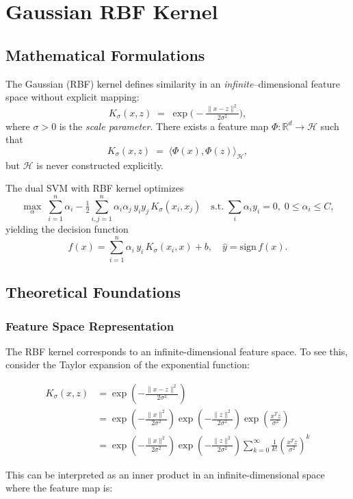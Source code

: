 \documentclass[11pt]{article}
\begin{document}
\section{Gaussian RBF Kernel}

\subsection{Mathematical Formulations}
The Gaussian (RBF) kernel defines similarity in an \emph{infinite}–dimensional feature space without explicit mapping:
\[
K_\sigma(x,z) \;=\;\exp\!\bigl(-\tfrac{\|x-z\|^2}{2\sigma^2}\bigr),
\]
where $\sigma>0$ is the \emph{scale parameter}. There exists a feature map $\Phi: \mathbb{R}^d\to\mathcal{H}$ such that
\[
K_\sigma(x,z) \;=\;\langle \Phi(x),\Phi(z)\rangle_{\mathcal{H}},
\]
but $\mathcal{H}$ is never constructed explicitly.

The dual SVM with RBF kernel optimizes
\[
\max_{\alpha}\;\sum_{i=1}^n \alpha_i
-\tfrac{1}{2}\sum_{i,j=1}^n\alpha_i\alpha_j\,y_i y_j\,K_\sigma(x_i,x_j)
\quad\text{s.t.}\;\sum_i \alpha_i y_i=0,\;0\le \alpha_i\le C,
\]
yielding the decision function
\[
f(x)=\sum_{i=1}^n \alpha_i\,y_i\,K_\sigma(x_i,x) + b,\quad
\hat y=\mathrm{sign}\,f(x).
\]

\subsection{Theoretical Foundations}

\subsubsection{Feature Space Representation}
The RBF kernel corresponds to an infinite-dimensional feature space. To see this, consider the Taylor expansion of the exponential function:

\begin{align}
K_\sigma(x,z) &= \exp\left(-\frac{\|x-z\|^2}{2\sigma^2}\right) \\
&= \exp\left(-\frac{\|x\|^2}{2\sigma^2}\right) \exp\left(-\frac{\|z\|^2}{2\sigma^2}\right) \exp\left(\frac{x^Tz}{\sigma^2}\right) \\
&= \exp\left(-\frac{\|x\|^2}{2\sigma^2}\right) \exp\left(-\frac{\|z\|^2}{2\sigma^2}\right) \sum_{k=0}^{\infty} \frac{1}{k!}\left(\frac{x^Tz}{\sigma^2}\right)^k
\end{align}

This can be interpreted as an inner product in an infinite-dimensional space where the feature map is:
\end{document}
